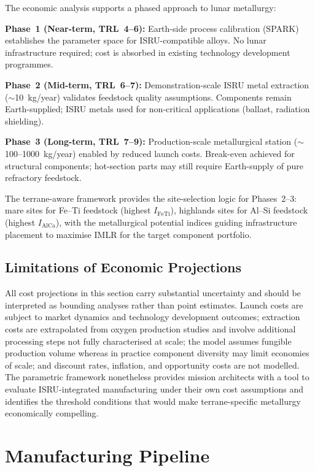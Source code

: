 \documentclass[11pt,a4paper]{article}
\begin{document}
The economic analysis supports a phased approach to lunar metallurgy:

\textbf{Phase~1 (Near-term, TRL~4--6):} Earth-side process calibration (SPARK) establishes the parameter space for ISRU-compatible alloys. No lunar infrastructure required; cost is absorbed in existing technology development programmes.

\textbf{Phase~2 (Mid-term, TRL~6--7):} Demonstration-scale ISRU metal extraction ($\sim$10~kg/year) validates feedstock quality assumptions. Components remain Earth-supplied; ISRU metals used for non-critical applications (ballast, radiation shielding).

\textbf{Phase~3 (Long-term, TRL~7--9):} Production-scale metallurgical station ($\sim$100--1000~kg/year) enabled by reduced launch costs. Break-even achieved for structural components; hot-section parts may still require Earth-supply of pure refractory feedstock.

The terrane-aware framework provides the site-selection logic for Phases~2--3: mare sites for Fe--Ti feedstock (highest $I_{\text{FeTi}}$), highlands sites for Al--Si feedstock (highest $I_{\text{AlCa}}$), with the metallurgical potential indices guiding infrastructure placement to maximise IMLR for the target component portfolio.

\subsection{Limitations of Economic Projections}
\label{subsec:econ_limitations}

All cost projections in this section carry substantial uncertainty and should be interpreted as bounding analyses rather than point estimates. Launch costs are subject to market dynamics and technology development outcomes; extraction costs are extrapolated from oxygen production studies and involve additional processing steps not fully characterised at scale; the model assumes fungible production volume whereas in practice component diversity may limit economies of scale; and discount rates, inflation, and opportunity costs are not modelled. The parametric framework nonetheless provides mission architects with a tool to evaluate ISRU-integrated manufacturing under their own cost assumptions and identifies the threshold conditions that would make terrane-specific metallurgy economically compelling.

\section{Manufacturing Pipeline}
\label{sec:pipeline}
\end{document}
